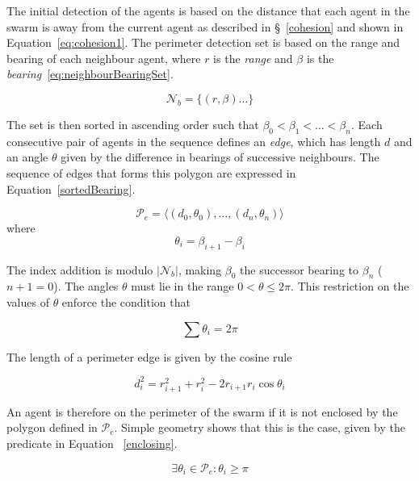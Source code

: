 \documentclass[12pt,a4paper]{article}
\begin{document}
The initial detection of the agents is based on the distance that each agent in the swarm is away from the current agent as described in \S~\ref{cohesion} and shown in Equation~\ref{eq:cohesion1}. The perimeter detection set is based on the range and bearing of each neighbour agent, where $r$ is the \textit{range} and $\beta$ is the \textit{bearing}~\ref{eq:neighbourBearingSet}.

\begin{equation}\label{eq:neighbourBearingSet}
	\mathcal{N}_b = \{ (r,\beta) \ldots \} 
\end{equation}

The set is then sorted in ascending order such that $\beta_0 < \beta_1 < \ldots < \beta_n$. Each consecutive pair of agents in the sequence defines an \textit{edge}, which has length $d$ and an angle $\theta$ given by the difference in bearings of successive neighbours. The sequence of edges that forms this polygon are expressed in Equation~\ref{sortedBearing}.

\begin{equation}\label{sortedBearing}
	\mathcal{P}_e = \langle (d_0,\theta_0), \ldots , (d_n,\theta_n) \rangle
\end{equation}
where
\begin{equation}
	\theta_i = \beta_{i+1} - \beta_i
\end{equation}

The index addition is modulo $|\mathcal N_b|$, making $\beta_0$ the successor bearing to $\beta_n$ ($n+1 = 0$).  The angles $\theta$ must lie in the range $0<\theta\leq2\pi$. This restriction on the values of $\theta$ enforce the condition that

\begin{equation}
	\sum\theta_i = 2\pi
\end{equation}

The length of a perimeter edge is given by the cosine rule

\begin{equation}
	d_i^2 = r_{i+1}^2 + r_i^2 -2r_{i+1}r_i \cos\theta_i
\end{equation}

An agent is therefore on the perimeter of the swarm if it is not enclosed by the polygon defined in $\mathcal{P}_e$.  Simple geometry shows that this is the case, given by the predicate in Equation ~\ref{enclosing}.

\begin{equation}
	\exists \theta_i \in \mathcal{P}_e : \theta_i\geq\pi
	\label{enclosing}
\end{equation}
\end{document}
